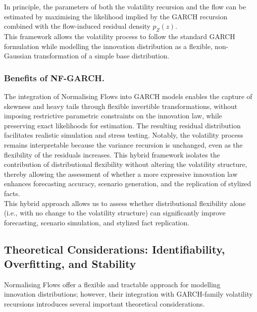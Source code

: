 \documentclass[oneside,12pt]{CUEDthesisPSnPDF}
\begin{document}
In principle, the parameters of both the volatility recursion and the flow can be estimated by maximising the likelihood implied by the GARCH recursion combined with the flow-induced residual density \( p_Z(z)\).\\

\noindent This framework allows the volatility process to follow the standard GARCH formulation while modelling the innovation distribution as a flexible, non-Gaussian transformation of a simple base distribution.\\

\subsubsection{Benefits of NF-GARCH.} The integration of Normalising Flows into GARCH models enables the capture of skewness and heavy tails through flexible invertible transformations, without imposing restrictive parametric constraints on the innovation law, while preserving exact likelihoods for estimation. The resulting residual distribution facilitates realistic simulation and stress testing. Notably, the volatility process remains interpretable because the variance recursion is unchanged, even as the flexibility of the residuals increases. This hybrid framework isolates the contribution of distributional flexibility without altering the volatility structure, thereby allowing the assessment of whether a more expressive innovation law enhances forecasting accuracy, scenario generation, and the replication of stylized facts.\\

This hybrid approach allows us to assess whether distributional flexibility alone (i.e., with no change to the volatility structure) can significantly improve forecasting, scenario simulation, and stylized fact replication.\\


\subsection{Theoretical Considerations: Identifiability, Overfitting, and Stability}
\noindent
Normalising Flows offer a flexible and tractable approach for modelling innovation distributions; however, their integration with GARCH-family volatility recursions introduces several important theoretical considerations.\\
\end{document}
